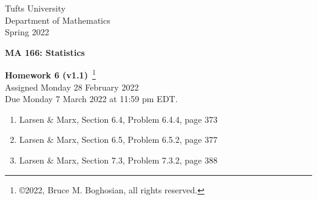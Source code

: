 \documentclass [12pt] {article}
\begin{document}
\thispagestyle{empty}
\begin{center}
Tufts University\\
Department of Mathematics\\
Spring 2022 \\
\end{center}
\begin{center}
{\bf MA 166: Statistics}\\
\end{center}
\begin{center}
{\bf\Large Homework 6 {\small (v1.1)}}~\footnote{\copyright 2022, Bruce M. Boghosian, all rights reserved.}\\
Assigned Monday 28 February 2022\\
Due Monday 7 March 2022 at 11:59 pm EDT.
\end{center}

\begin{enumerate}

\item Larsen \& Marx, Section 6.4, Problem 6.4.4, page 373

\item Larsen \& Marx, Section 6.5, Problem 6.5.2, page 377

\item Larsen \& Marx, Section 7.3, Problem 7.3.2, page 388

\end{enumerate}
\end{document}
